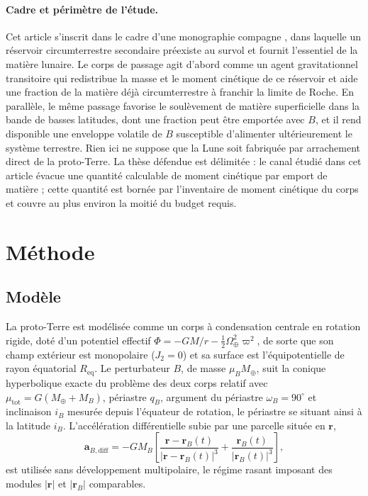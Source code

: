 \documentclass[11pt,a4paper]{article}
\begin{document}
\paragraph{Cadre et périmètre de l'étude.} Cet article s'inscrit dans le cadre d'une monographie compagne \cite{Debailleul2026}, dans laquelle un réservoir circumterrestre secondaire préexiste au survol et fournit l'essentiel de la matière lunaire. Le corps de passage agit d'abord comme un agent gravitationnel transitoire qui redistribue la masse et le moment cinétique de ce réservoir et aide une fraction de la matière déjà circumterrestre à franchir la limite de Roche. En parallèle, le même passage favorise le soulèvement de matière superficielle dans la bande de basses latitudes, dont une fraction peut être emportée avec $B$, et il rend disponible une enveloppe volatile de $B$ susceptible d'alimenter ultérieurement le système terrestre. Rien ici ne suppose que la Lune soit fabriquée par arrachement direct de la proto-Terre. La thèse défendue est délimitée : le canal étudié dans cet article évacue une quantité calculable de moment cinétique par emport de matière ; cette quantité est bornée par l'inventaire de moment cinétique du corps et couvre au plus environ la moitié du budget requis.

\section{Méthode}

\subsection{Modèle}
La proto-Terre est modélisée comme un corps à condensation centrale en rotation rigide, doté d'un potentiel effectif $\Phi = -GM/r - \frac{1}{2}\Omega_\oplus^2 \varpi^2$, de sorte que son champ extérieur est monopolaire ($J_2 = 0$) et sa surface est l'équipotentielle de rayon équatorial $R_{\mathrm{eq}}$. Le perturbateur $B$, de masse $\mu_B M_\oplus$, suit la conique hyperbolique exacte du problème des deux corps relatif avec $\mu_{\mathrm{tot}} = G(M_\oplus + M_B)$, périastre $q_B$, argument du périastre $\omega_B = 90^\circ$ et inclinaison $i_B$ mesurée depuis l'équateur de rotation, le périastre se situant ainsi à la latitude $i_B$. L'accélération différentielle subie par une parcelle située en $\mathbf{r}$,
\begin{equation}
\mathbf{a}_{B,\mathrm{diff}} = -G M_B \left[ \frac{\mathbf{r} - \mathbf{r}_B(t)}{|\mathbf{r} - \mathbf{r}_B(t)|^3} + \frac{\mathbf{r}_B(t)}{|\mathbf{r}_B(t)|^3} \right],
\end{equation}
est utilisée sans développement multipolaire, le régime rasant imposant des modules $|\mathbf{r}|$ et $|\mathbf{r}_B|$ comparables.
\end{document}
